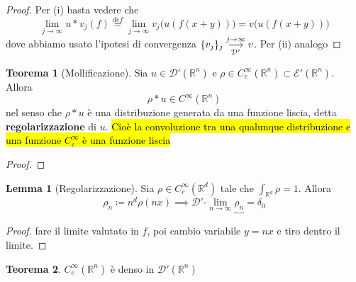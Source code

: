 \documentclass[a4paper,10pt]{article}
\theoremstyle{definition}
\newcommand{\re}{\mathbb{R}} %
\newcommand{\llim}[2]{#2\text{-}\lim_{#1\to\infty}} %
\newcommand{\limm}[2]{\overunderset{#1\to\infty}{#2}{\longrightarrow}} %
\theoremstyle{indentdefinition}
\theoremstyle{indenttheorem}
\newtheorem{thm}{Teorema}
\newtheorem{lem*}{Lemma}
\theoremstyle{myremark}
\theoremstyle{indentgeneral}
\newenvironment{myboxed} 
{\noindent\begin{lrbox}{\mybox}\begin{minipage}{\textwidth}}
{\end{minipage}\end{lrbox}\fbox{\usebox{\mybox}}}
\begin{document}
\begin{proof}Per (i) basta vedere che
$$\lim_{j\to\infty}u*v_j(f)\overset{def}{=}\lim_{j\to\infty}v_j\bigg(u(f(x+y))\bigg)=v\bigg(u(f(x+y))\bigg)$$
dove abbiamo usato l'ipotesi di convergenza  $\{v_j\}_{j}\limm{j}{\mathcal{D}'}v$. Per (ii) analogo
    
\end{proof}


\begin{myboxed}
    \begin{thm}[Mollificazione]\label{thm-mollificazione} Sia $u\in\mathcal{D}'(\re^n)$ e $\rho\in C_c^\infty(\re^n)\subset\mathcal{E}'(\re^n)$. Allora
    $$\rho*u\in C^\infty(\re^n)$$
    nel senso che $\rho*u$ è una distribuzione generata da una funzione liscia, detta \textbf{regolarizzazione} di $u$. \hl{Cioè la convoluzione tra una qualunque distribuzione e una funzione $C_c^\infty$ è una funzione liscia}
    \end{thm}
\end{myboxed}
\begin{proof}
    \todo{}
\end{proof}

\begin{lem*}[Regolarizzazione]\label{lem-regolarizzazione}
    Sia $\rho\in C_c^\infty(\re^d)$ tale che $\int_{\re^d}\rho=1$. Allora
    $$\rho_n\coloneqq n^d\rho(nx)\implies \llim{n}{\mathcal{D}'}\underbrace{\rho_n}=\delta_0$$
\end{lem*}
\begin{proof}
    fare il limite valutato in $f$, poi  cambio variabile $y=nx$ e tiro dentro il limite.
\end{proof}

\begin{myboxed}
    \begin{thm}
        $C_c^\infty(\re^n)$ è denso in $\mathcal{D}'(\re^n)$
    \end{thm}
\end{myboxed}
\end{document}
